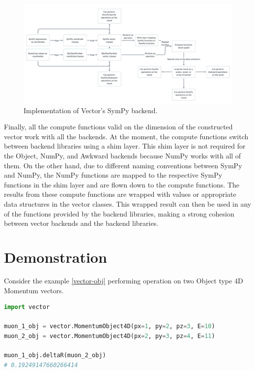 \documentclass{webofc}
\begin{document}
\begin{figure}[h]
     \centering
     \includegraphics[width=\textwidth]{sympy-backend.png}
     \caption{Implementation of Vector's SymPy backend.}
        \label{fig:sympy}
\end{figure}

Finally, all the compute functions valid on the dimension of the constructed vector work with all the backends. At the moment, the compute functions switch between backend libraries using a shim layer. This shim layer is not required for the Object, NumPy, and Awkward backends because NumPy works with all of them. On the other hand, due to different naming conventions between SymPy and NumPy, the NumPy functions are mapped to the respective SymPy functions in the shim layer and are flown down to the compute functions. The results from these compute functions are wrapped with values or appropriate data structures in the vector classes. This wrapped result can then be used in any of the functions provided by the backend libraries, making a strong cohesion between vector backends and the backend libraries.

\section{Demonstration}
\label{sec-demonstration}

Consider the example \ref{vector-obj} performing  operation on two Object type 4D Momentum vectors.

\begin{lstlisting}[language=Python,mathescape=true,caption={Performing deltaR on Object vectors.},captionpos=b, label={vector-obj}]
import vector

muon_1_obj = vector.MomentumObject4D(px=1, py=2, pz=3, E=10)
muon_2_obj = vector.MomentumObject4D(px=2, py=3, pz=4, E=11)

muon_1_obj.deltaR(muon_2_obj)
# 0.19249147660266414
\end{lstlisting}
\end{document}
